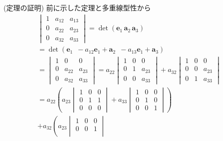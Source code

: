 \documentclass[openany, a4paper, oneside]{book}
\theoremstyle{break}
\theoremstyle{breakdefn}
\begin{document}
(定理の証明)
前に示した定理と多重線型性から
    \begin{gather}
        \begin{vmatrix} 1 & a_{12} & a_{13} \\
                              0 & a_{22} & a_{23} \\
                              0 & a_{32} & a_{33}
        \end{vmatrix}
        =
        \det (\bm{e}_{1} \, \bm{a}_{2} \, \bm{a}_{3} )  \\
        =
        \det (\bm{e}_{1} \,\,\, -a_{12}\bm{e}_{1} + \bm{a}_{2} \,\,\, -a_{13}\bm{e}_{1} + \bm{a}_{3} )\\
        =
        \begin{vmatrix} 1 & 0 & 0 \\
                        0 & a_{22} & a_{23} \\
                        0 & a_{32} & a_{33}
        \end{vmatrix}
        =
        a_{22}\begin{vmatrix} 1 & 0 & 0 \\
                              0 & 1 & a_{23} \\
                              0 & 0 & a_{33}
        \end{vmatrix}
        +a_{32}\begin{vmatrix} 1 & 0 & 0 \\
                                0 & 0 & a_{23} \\
                                0 & 1 & a_{33}
        \end{vmatrix} \\
        =
        a_{22} \left (
        a_{23}\begin{vmatrix} 1 & 0 & 0 \\
                              0 & 1 & 1 \\
                              0 & 0 & 0
        \end{vmatrix}
        +a_{33}\begin{vmatrix} 1 & 0 & 0 \\
                               0 & 1 & 0 \\
                               0 & 0 & 1
        \end{vmatrix}
        \right) \\
        +a_{32}\left (
        a_{23}\begin{vmatrix} 1 & 0 & 0 \\
                              0 & 0 & 1 \\

\end{vmatrix}
\end{gather}
\end{document}
